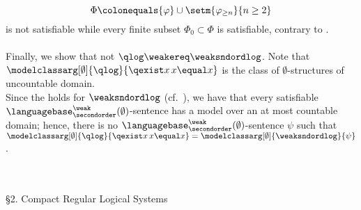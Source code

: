 \begin{enumerate}[1.]
\[
\Phi \colonequals \{\varphi\} \cup \setm{\varphi_{\geq n}}{n \geq 2}
\]
is not satisfiable while every finite subset $\Phi_0 \subset \Phi$ is satisfiable, contrary to .\\
\ \\
Finally, we show that not $\qlog \weakereq \weaksndordlog$. Note that $\modelclassarg[\emptyset]{\qlog}{\qexist x \, x \equal x}$ is the class of $\emptyset$-structures of uncountable domain.\medskip\\
Since the  holds for $\weaksndordlog$ (cf.\ ), we have that every satisfiable $\languagebase^\weak_\secondorder(\emptyset)$-sentence has a model over an at most countable domain; hence, there is no $\languagebase^\weak_\secondorder(\emptyset)$-sentence $\psi$ such that $\modelclassarg[\emptyset]{\qlog}{\qexist x \, x \equal x} = \modelclassarg[\emptyset]{\weaksndordlog}{\psi}$.
%
\end{enumerate}
\
\\
\\
{\large \S2. Compact Regular Logical Systems}
